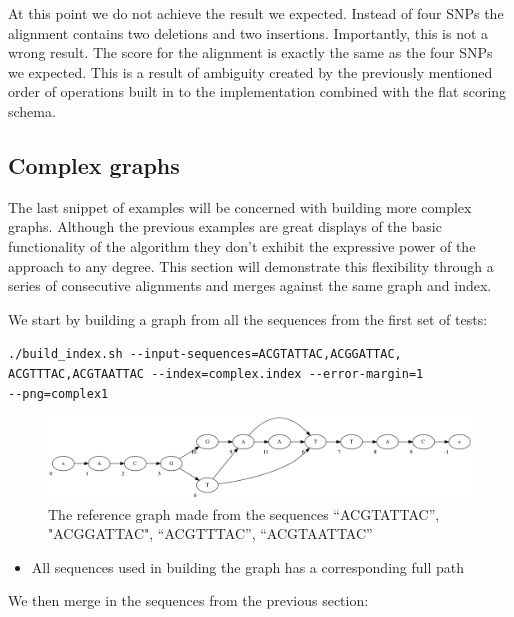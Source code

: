 \documentclass[thesis.tex]{subfiles}
\begin{document}
\noindent
At this point we do not achieve the result we expected. Instead of four SNPs the alignment contains two deletions and two insertions. Importantly, this is not a wrong result. The score for the alignment is exactly the same as the four SNPs we expected. This is a result of ambiguity created by the previously mentioned order of operations built in to the implementation combined with the flat scoring schema. 
\subsection*{Complex graphs}
The last snippet of examples will be concerned with building more complex graphs. Although the previous examples are great displays of the basic functionality of the algorithm they don't exhibit the expressive power of the approach to any degree. This section will demonstrate this flexibility through a series of consecutive alignments and merges against the same graph and index.\\
\par\noindent
We start by building a graph from all the sequences from the first set of tests:\\
\par\noindent
\texttt{./build\_index.sh -{}-input-sequences=ACGTATTAC,ACGGATTAC,\\ACGTTTAC,ACGTAATTAC -{}-index=complex.index -{}-error-margin=1 \\-{}-png=complex1}\\
\par\noindent
\begin{figure}[H]
  \begin{mdframed}
  \includegraphics[width=\textwidth]{output/complex.png}
  \caption[A complex reference graph]{The reference graph made from the sequences ``ACGTATTAC'', "ACGGATTAC", ``ACGTTTAC'', ``ACGTAATTAC''}
  \label{fig:validation_complex_ref}
  \end{mdframed}
\end{figure}
\begin{itemize}
  \item All sequences used in building the graph has a corresponding full path
\end{itemize}
\noindent
We then merge in the sequences from the previous section:\\
\end{document}
